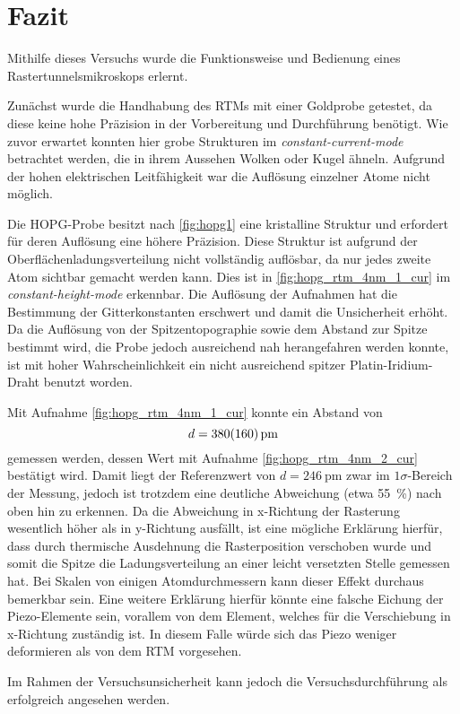 \section{Fazit}\label{sec:fazit}
Mithilfe dieses Versuchs wurde die Funktionsweise und Bedienung eines Rastertunnelsmikroskops 
erlernt.\\\par
Zunächst wurde die Handhabung des RTMs mit einer Goldprobe getestet, da diese keine hohe 
Präzision in der Vorbereitung und Durchführung benötigt. Wie zuvor 
erwartet konnten hier grobe Strukturen im \emph{constant-current-mode} betrachtet werden, 
die in ihrem Aussehen Wolken oder Kugel ähneln. Aufgrund der hohen elektrischen 
Leitfähigkeit war die Auflösung einzelner Atome nicht möglich.\\\par
Die HOPG-Probe besitzt nach \cref{fig:hopg1} eine kristalline Struktur und erfordert
für deren Auflösung eine höhere Präzision. Diese Struktur ist aufgrund 
der Oberflächenladungsverteilung nicht vollständig auflösbar, da nur jedes zweite Atom sichtbar gemacht 
werden kann. Dies ist in \cref{fig:hopg_rtm_4nm_1_cur} im \emph{constant-height-mode} 
erkennbar. Die Auflösung der Aufnahmen hat die Bestimmung der Gitterkonstanten erschwert und 
damit die Unsicherheit erhöht. Da die Auflösung von der Spitzentopographie sowie dem Abstand 
zur Spitze bestimmt wird, die Probe jedoch ausreichend nah herangefahren werden konnte, 
ist mit hoher Wahrscheinlichkeit ein nicht ausreichend spitzer Platin-Iridium-Draht benutzt worden.\par 
Mit Aufnahme \cref{fig:hopg_rtm_4nm_1_cur} konnte ein Abstand von 
\[d = \SI{380\pm 160}{\pm}\]
gemessen werden, dessen Wert mit Aufnahme \cref{fig:hopg_rtm_4nm_2_cur} bestätigt wird. Damit 
liegt der Referenzwert von $d = \SI{246}{\pm}$ \cite{rtm-leitpfaden} zwar im $1\sigma$-Bereich der 
Messung, jedoch ist trotzdem eine deutliche Abweichung (etwa \SI{55}{\percent}) nach oben hin zu erkennen. Da die Abweichung 
in x-Richtung der Rasterung wesentlich höher als in y-Richtung ausfällt, ist eine mögliche Erklärung 
hierfür, dass durch thermische Ausdehnung die Rasterposition verschoben wurde und somit 
die Spitze die Ladungsverteilung an einer leicht versetzten Stelle gemessen hat. Bei Skalen von einigen
Atomdurchmessern kann dieser Effekt durchaus bemerkbar sein. Eine weitere Erklärung hierfür könnte
eine falsche Eichung der Piezo-Elemente sein, vorallem von dem Element, welches für 
die Verschiebung in x-Richtung zuständig ist. In diesem Falle würde sich das Piezo 
weniger deformieren als von dem RTM vorgesehen. \par
Im Rahmen der Versuchsunsicherheit kann jedoch die Versuchsdurchführung als erfolgreich 
angesehen werden.